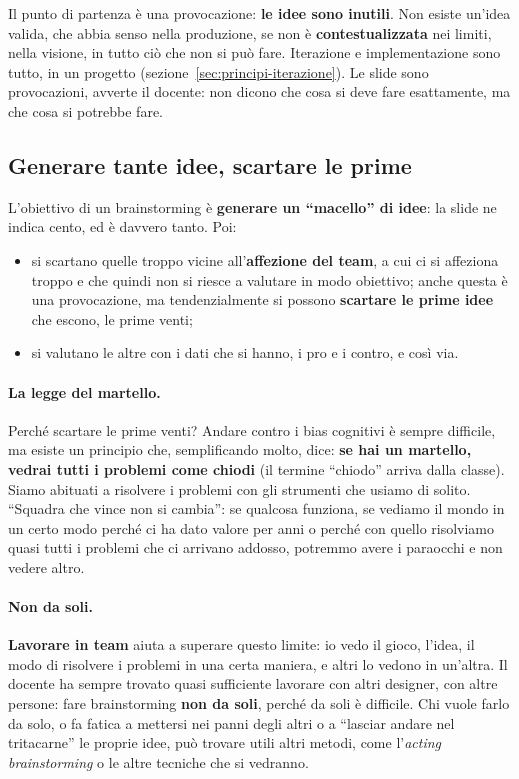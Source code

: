 Il punto di partenza è una provocazione: \textbf{le idee sono inutili}. Non
esiste un'idea valida, che abbia senso nella produzione, se non è
\textbf{contestualizzata} nei limiti, nella visione, in tutto ciò che non si
può fare. Iterazione e implementazione sono tutto, in un progetto
(sezione~\ref{sec:principi-iterazione}). Le slide sono provocazioni, avverte
il docente: non dicono che cosa si deve fare esattamente, ma che cosa si
potrebbe fare.

\subsection{Generare tante idee, scartare le prime}

L'obiettivo di un brainstorming è \textbf{generare un ``macello'' di idee}: la
slide ne indica cento, ed è davvero tanto. Poi:
\begin{itemize}
  \item si scartano quelle troppo vicine all'\textbf{affezione del team}, a cui
        ci si affeziona troppo e che quindi non si riesce a valutare in modo
        obiettivo; anche questa è una provocazione, ma tendenzialmente si
        possono \textbf{scartare le prime idee} che escono, le prime venti;
  \item si valutano le altre con i dati che si hanno, i pro e i contro, e così
        via.
\end{itemize}

\paragraph{La legge del martello.} Perché scartare le prime venti? Andare
contro i bias cognitivi è sempre difficile, ma esiste un principio che,
semplificando molto, dice: \textbf{se hai un martello, vedrai tutti i problemi
come chiodi} (il termine ``chiodo'' arriva dalla classe). Siamo abituati a
risolvere i problemi con gli strumenti che usiamo di solito. ``Squadra che
vince non si cambia'': se qualcosa funziona, se vediamo il mondo in un certo
modo perché ci ha dato valore per anni o perché con quello risolviamo quasi
tutti i problemi che ci arrivano addosso, potremmo avere i paraocchi e non
vedere altro.

\paragraph{Non da soli.} \textbf{Lavorare in team} aiuta a superare questo
limite: io vedo il gioco, l'idea, il modo di risolvere i problemi in una certa
maniera, e altri lo vedono in un'altra. Il docente ha sempre trovato quasi
sufficiente lavorare con altri designer, con altre persone: fare
brainstorming \textbf{non da soli}, perché da soli è difficile. Chi vuole
farlo da solo, o fa fatica a mettersi nei panni degli altri o a ``lasciar
andare nel tritacarne'' le proprie idee, può trovare utili altri metodi, come
l'\emph{acting brainstorming} o le altre tecniche che si vedranno.

